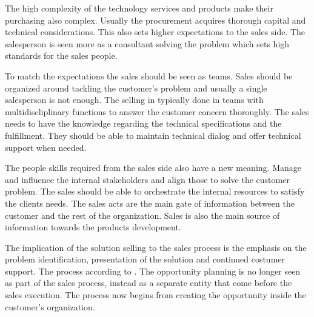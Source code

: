 \documentclass[12pt,a4paper,oneside,pdftex]{report}
\begin{document}
The high complexity of the technology services and products make their purchasing also complex. Usually the procurement acquires thorough capital and technical considerations. This also sets higher expectations to the sales side. The salesperson is seen more as a consultant solving the problem which sets high standards for the sales people. \citep{Sharma}

To match the expectations the sales should be seen as teams. Sales should be organized around tackling the customer's problem and usually a single salesperson is not enough. The selling in typically done in teams with multidiscliplinary functions to answer the customer concern thoroughly. The sales needs to have the knowledge regarding the technical specifications and the fulfillment. They should be able to maintain technical dialog and offer technical support when needed.  \citep{Sharma}

The people skills required from the sales side also have a new meaning. Manage and influence the internal stakeholders and align those to solve the customer problem. The sales should be able to orchestrate the internal resources to satisfy the clients needs. The sales acts are the main gate of information between the customer and the rest of the organization. Sales is also the main source of information towards the products development.  \citep{Sharma}

The implication of the solution selling to the sales process is the emphasis on the problem identification, presentation of the solution and continued costumer support. The process according to \citep{Eades}. The opportunity planning is no longer seen as part of the sales process, instead as a separate entity that come before the sales execution. The process now begins from creating the opportunity inside the customer's organization. 
\end{document}
